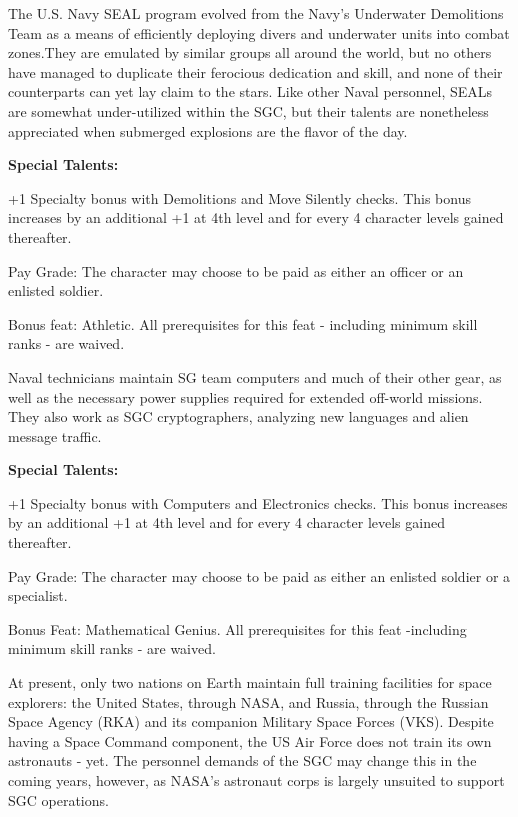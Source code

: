 The U.S. Navy SEAL program evolved from the Navy's Underwater Demolitions Team as a means of efficiently deploying divers and underwater units into combat zones.They are emulated by similar groups all around the world, but no others have managed to duplicate their ferocious dedication and skill, and none of their counterparts can yet lay claim to the stars. Like other Naval personnel, SEALs are somewhat under-utilized within the SGC, but their talents are nonetheless appreciated when submerged explosions are the flavor of the day.

\textbf{Special Talents:}
\begin{itemize*}
\item +1 Specialty bonus with Demolitions and Move Silently checks. This bonus increases by an additional +1 at 4th level and for every 4 character levels gained thereafter.
\item Pay Grade: The character may choose to be paid as either an officer or an enlisted soldier.
\item Bonus feat: Athletic. All prerequisites for this feat - including minimum skill ranks - are waived.
\end{itemize*}

Naval technicians maintain SG team computers and much of their other gear, as well as the necessary power supplies required for extended off-world missions. They also work as SGC cryptographers, analyzing new languages and alien message traffic.

\textbf{Special Talents:}
\begin{itemize*}
\item +1 Specialty bonus with Computers and Electronics checks. This bonus increases by an additional +1 at 4th level and for every 4 character levels gained thereafter.
\item Pay Grade: The character may choose to be paid as either an enlisted soldier or a specialist.
\item Bonus Feat: Mathematical Genius. All prerequisites for this feat -including minimum skill ranks - are waived.
\end{itemize*}

At present, only two nations on Earth maintain full training facilities for space explorers: the United States, through NASA, and Russia, through the Russian Space Agency (RKA) and its companion Military Space Forces (VKS). Despite having a Space Command component, the US Air Force does not train its own astronauts - yet. The personnel demands of the SGC may change this in the coming years, however, as NASA's astronaut corps is largely unsuited to support SGC operations.

